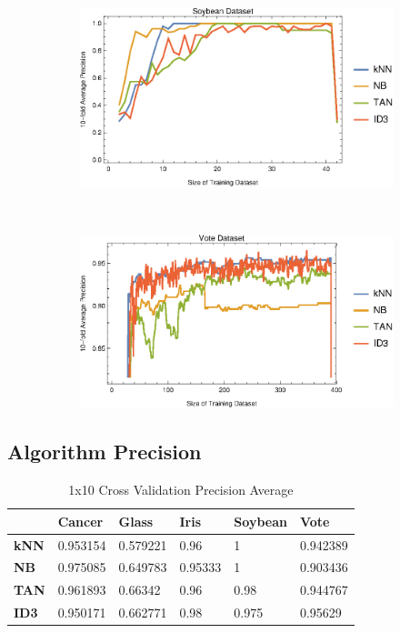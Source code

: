 \documentclass{article}
\begin{document}
\begin{figure}[h]
\begin{subfigure}[b]{0.49\textwidth}
			\end{subfigure} \	
			\begin{subfigure}[b]{0.49\textwidth}
				\centering
				\includegraphics[width=\textwidth]{figs//plot_conv_soybean}					
			\end{subfigure} \	
			\begin{subfigure}[b]{0.49\textwidth}
				\centering
				\includegraphics[width=\textwidth]{figs/plot_conv_vote}					
			\end{subfigure}
			\caption{}
			\label{conv_plot}
		\end{figure}
	\subsection{Algorithm Precision}
		\begin{table} \centering
			
			\begin{tabular}  { | l | l | l | l | l | l | }
				\hline
				& \textbf{Cancer} & \textbf{Glass} & \textbf{Iris} & \textbf{Soybean} & \textbf{Vote} \\
				\hline
				\textbf{kNN} & 0.953154  & 0.579221 & 0.96 & 1 & 0.942389  \\
				\hline
				\textbf{NB} & 0.975085 & 0.649783 & 0.95333 & 1 & 0.903436  \\
				\hline
				\textbf{TAN} & 0.961893 & 0.66342 & 0.96 & 0.98 & 0.944767  \\
				\hline
				\textbf{ID3} & 0.950171 & 0.662771 & 0.98 & 0.975 & 0.95629  \\
				\hline
				
			\end{tabular}
			\caption{1x10 Cross Validation Precision Average}
			\label{table}
		\end{table}
\end{document}
